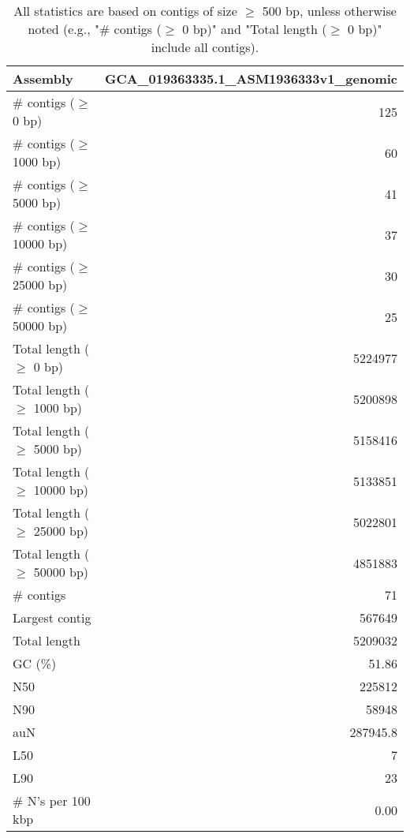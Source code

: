 \documentclass[12pt,a4paper]{article}
\begin{document}
\begin{table}[ht]
\begin{center}
\caption{All statistics are based on contigs of size $\geq$ 500 bp, unless otherwise noted (e.g., "\# contigs ($\geq$ 0 bp)" and "Total length ($\geq$ 0 bp)" include all contigs).}
\begin{tabular}{|l*{1}{|r}|}
\hline
Assembly & GCA\_019363335.1\_ASM1936333v1\_genomic \\ \hline
\# contigs ($\geq$ 0 bp) & 125 \\ \hline
\# contigs ($\geq$ 1000 bp) & 60 \\ \hline
\# contigs ($\geq$ 5000 bp) & 41 \\ \hline
\# contigs ($\geq$ 10000 bp) & 37 \\ \hline
\# contigs ($\geq$ 25000 bp) & 30 \\ \hline
\# contigs ($\geq$ 50000 bp) & 25 \\ \hline
Total length ($\geq$ 0 bp) & 5224977 \\ \hline
Total length ($\geq$ 1000 bp) & 5200898 \\ \hline
Total length ($\geq$ 5000 bp) & 5158416 \\ \hline
Total length ($\geq$ 10000 bp) & 5133851 \\ \hline
Total length ($\geq$ 25000 bp) & 5022801 \\ \hline
Total length ($\geq$ 50000 bp) & 4851883 \\ \hline
\# contigs & 71 \\ \hline
Largest contig & 567649 \\ \hline
Total length & 5209032 \\ \hline
GC (\%) & 51.86 \\ \hline
N50 & 225812 \\ \hline
N90 & 58948 \\ \hline
auN & 287945.8 \\ \hline
L50 & 7 \\ \hline
L90 & 23 \\ \hline
\# N's per 100 kbp & 0.00 \\ \hline
\end{tabular}
\end{center}
\end{table}
\end{document}
